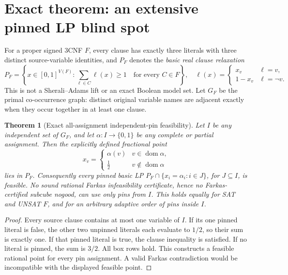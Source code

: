 \documentclass[11pt]{article}
\newtheorem{theorem}{Theorem}
\begin{document}
\section{Exact theorem: an extensive pinned LP blind spot}
For a proper signed 3CNF \(F\), every clause has exactly three literals
with three distinct source-variable identities, and \(P_F\) denotes the
\emph{basic real clause relaxation}
\[
P_F=\left\{x\in[0,1]^{V(F)}:
 \sum_{\ell\in C} \ell(x)\ge1\quad\text{for every }C\in F\right\},
\quad
\ell(x)=\begin{cases}x_v&\ell=v,\\1-x_v&\ell=\neg v.\end{cases}
\]
This is not a Sherali--Adams lift or an exact Boolean model set. Let \(G_F\)
be the primal co-occurrence graph: distinct original variable names are
adjacent exactly when they occur together in at least one clause.

\begin{theorem}[Exact all-assignment independent-pin feasibility]
Let \(I\) be \emph{any} independent set of \(G_F\), and let
\(\alpha:I\to\{0,1\}\) be \emph{any} complete or partial assignment.
Then the explicitly defined fractional point
\[
x_v=\begin{cases}
\alpha(v)&v\in\operatorname{dom}\alpha,\\
\tfrac12&v\notin\operatorname{dom}\alpha
\end{cases}
\]
lies in \(P_F\). Consequently every pinned basic LP
\(P_F\cap\{x_i=\alpha_i:i\in J\}\), for \(J\subseteq I\), is feasible.
No sound rational Farkas infeasibility certificate, hence no
Farkas-certified subcube nogood, can use \emph{only} pins from \(I\).
This holds equally for SAT and UNSAT \(F\), and for an arbitrary
adaptive order of pins inside \(I\).
\end{theorem}
\begin{proof}
Every source clause contains at most one variable of \(I\). If its one
pinned literal is false, the other two unpinned literals each evaluate to
\(1/2\), so their sum is exactly one. If that pinned literal is true,
the clause inequality is satisfied. If no literal is pinned, the sum
is \(3/2\). All box rows hold. This constructs a feasible rational point
for every pin assignment. A valid Farkas contradiction would be
incompatible with the displayed feasible point.
\end{proof}
\end{document}
